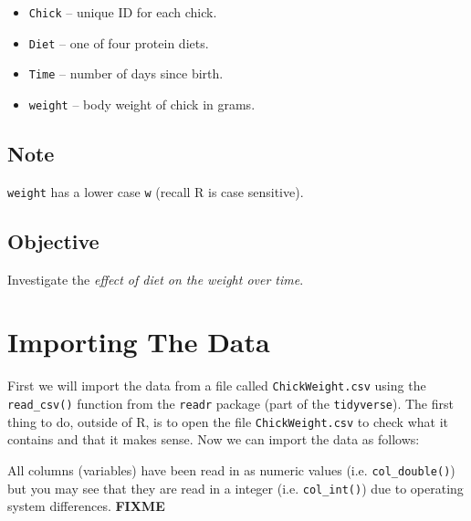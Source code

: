 \documentclass[letterpaperpaper,9pt,twocolumn,twoside,printwatermark=false]{pinp}
\providecommand{\tightlist}{%
  \setlength{\itemsep}{0pt}\setlength{\parskip}{0pt}}
\begin{document}
\begin{itemize}
\tightlist
\item
  \texttt{Chick} -- unique ID for each chick.
\item
  \texttt{Diet} -- one of four protein diets.
\item
  \texttt{Time} -- number of days since birth.
\item
  \texttt{weight} -- body weight of chick in grams.
\end{itemize}

\hypertarget{note}{%
\subsection{Note}\label{note}}

\texttt{weight} has a lower case \texttt{w} (recall R is case
sensitive).

\hypertarget{objective}{%
\subsection{Objective}\label{objective}}

Investigate the \emph{effect of diet on the weight over time}.

\hypertarget{importing-the-data}{%
\section{Importing The Data}\label{importing-the-data}}

First we will import the data from a file called
\texttt{ChickWeight.csv} using the \texttt{read\_csv()} function from
the \texttt{readr} package (part of the \texttt{tidyverse}). The first
thing to do, outside of R, is to open the file \texttt{ChickWeight.csv}
to check what it contains and that it makes sense. Now we can import the
data as follows:

\begin{Shaded}
\begin{Highlighting}[]
\NormalTok{(}
\StringTok{ }\NormalTok{(}\NormalTok{)}
\end{Highlighting}
\end{Shaded}

All columns (variables) have been read in as numeric values (i.e.
\texttt{col\_double()}) but you may see that they are read in a integer
(i.e. \texttt{col\_int()}) due to operating system differences.
\textbf{FIXME}
\end{document}
